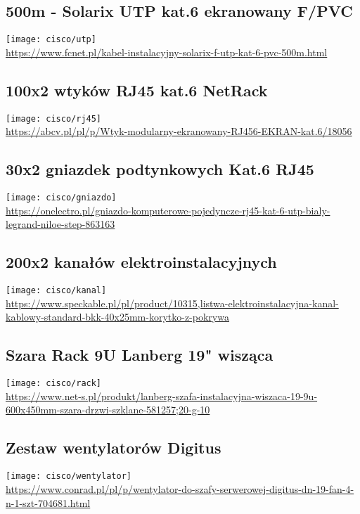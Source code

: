 \subsection{500m - Solarix UTP kat.6 ekranowany F/PVC}
    \texttt{[image: cisco/utp]} \\
    \url{https://www.fcnet.pl/kabel-instalacyjny-solarix-f-utp-kat-6-pvc-500m.html}

\subsection{100x2 wtyków RJ45 kat.6 NetRack}
    \texttt{[image: cisco/rj45]} \\
    \url{https://abcv.pl/pl/p/Wtyk-modularny-ekranowany-RJ456-EKRAN-kat.6/18056}

\subsection{30x2 gniazdek podtynkowych Kat.6 RJ45 }
    \texttt{[image: cisco/gniazdo]} \\
    \url{https://onelectro.pl/gniazdo-komputerowe-pojedyncze-rj45-kat-6-utp-bialy-legrand-niloe-step-863163}


\subsection{200x2 kanałów elektroinstalacyjnych}
    \texttt{[image: cisco/kanal]} \\
    \url{https://www.speckable.pl/pl/product/10315,listwa-elektroinstalacyjna-kanal-kablowy-standard-bkk-40x25mm-korytko-z-pokrywa}

\subsection{Szara Rack 9U Lanberg 19" wisząca}
    \texttt{[image: cisco/rack]} \\
    \url{https://www.net-s.pl/produkt/lanberg-szafa-instalacyjna-wiszaca-19-9u-600x450mm-szara-drzwi-szklane-581257;20-g-10}

\subsection{Zestaw wentylatorów Digitus}
    \texttt{[image: cisco/wentylator]} \\
    \url{https://www.conrad.pl/pl/p/wentylator-do-szafy-serwerowej-digitus-dn-19-fan-4-n-1-szt-704681.html}







